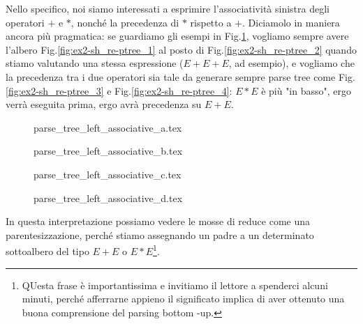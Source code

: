 \documentclass[class=book, crop=false, oneside, 12pt]{standalone}
\begin{document}
Nello specifico, noi siamo interessati a esprimire l'associatività sinistra degli operatori \(+\) e \(*\), nonché la precedenza di \(*\) rispetto a \(+\). Diciamolo in maniera ancora più pragmatica: se guardiamo gli esempi in Fig.\ref{fig:ex2-sh_re-ptree}, vogliamo sempre avere l'albero Fig.\ref{fig:ex2-sh_re-ptree_1} al posto di Fig.\ref{fig:ex2-sh_re-ptree_2} quando stiamo valutando una stessa espressione (\(E + E + E\), ad esempio), e vogliamo che la precedenza tra i due operatori sia tale da generare sempre parse tree come Fig.\ref{fig:ex2-sh_re-ptree_3} e Fig.\ref{fig:ex2-sh_re-ptree_4}: \(E*E\) è più "in basso", ergo verrà eseguita prima, ergo avrà precedenza su \(E+E\).
\begin{figure}[H]
    \begin{minipage}[b]{.4\textwidth}
        \centering
        {parse_tree_left_associative_a.tex}
        \label{fig:ex2-sh_re-ptree_1}
    \end{minipage}
    \hfill
    \begin{minipage}[b]{.4\textwidth}
        \centering
        {parse_tree_left_associative_b.tex}
        \label{fig:ex2-sh_re-ptree_2}
    \end{minipage}
    
    \begin{minipage}[b]{.4\textwidth}
        \centering
        {parse_tree_left_associative_c.tex}
        \label{fig:ex2-sh_re-ptree_3}
    \end{minipage}
    \hfill
    \begin{minipage}[b]{.4\textwidth}
        \centering
        {parse_tree_left_associative_d.tex}
        \label{fig:ex2-sh_re-ptree_4}
    \end{minipage}
    \caption{}
    \label{fig:ex2-sh_re-ptree}
\end{figure}
In questa interpretazione possiamo vedere le mosse di reduce come una parentesizzazione, perché stiamo assegnando un padre a un determinato sottoalbero del tipo \(E + E\) o \(E * E\)\footnote{QUesta frase è importantissima e invitiamo il lettore a spenderci alcuni minuti, perché afferrarne appieno il significato implica di aver ottenuto una buona comprensione del parsing bottom -up.}.
\end{document}
